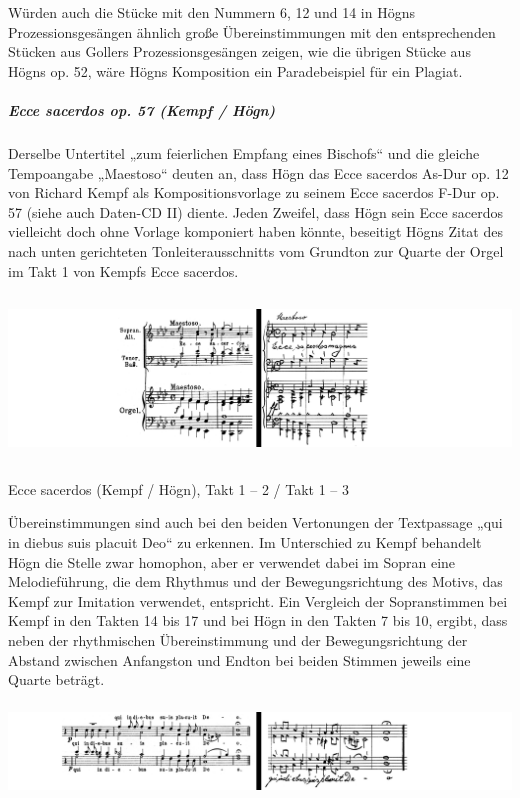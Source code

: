 Würden auch die Stücke mit den Nummern 6, 12 und 14 in Högns
Prozessionsgesängen ähnlich große Übereinstimmungen mit den
entsprechenden Stücken aus Gollers Prozessionsgesängen zeigen, wie die
übrigen Stücke aus Högns op. 52, wäre Högns Komposition ein
Paradebeispiel für ein Plagiat.

\subparagraph[Ecce sacerdos op. 57 (Kempf / Högn)]{Ecce sacerdos op. 57
(Kempf / Högn)}
Derselbe Untertitel „zum feierlichen Empfang eines Bischofs“ und die
gleiche Tempoangabe „Maestoso“ deuten an, dass Högn das Ecce sacerdos
As-Dur op. 12 von Richard Kempf als Kompositionsvorlage zu seinem Ecce
sacerdos F-Dur op. 57 (siehe auch Daten-CD II) diente. Jeden Zweifel,
dass Högn sein Ecce sacerdos vielleicht doch ohne Vorlage komponiert
haben könnte, beseitigt Högns Zitat des nach unten gerichteten
Tonleiterausschnitts vom Grundton zur Quarte der Orgel im Takt 1 von
Kempfs Ecce sacerdos.


\includegraphics[width=15.977cm,height=4.394cm]{pictures/zulassungsarbeit-img085.png}

\begin{figure}
\img{}
\caption{}
\end{figure}

Ecce sacerdos (Kempf / Högn), Takt 1 –
2  / Takt 1 – 3

Übereinstimmungen sind auch bei den beiden Vertonungen der Textpassage
„qui in diebus suis placuit Deo“ zu erkennen. Im Unterschied zu Kempf
behandelt Högn die Stelle zwar homophon, aber er verwendet dabei im
Sopran eine Melodieführung, die dem Rhythmus und der Bewegungsrichtung
des Motivs, das Kempf zur Imitation verwendet, entspricht. Ein
Vergleich der Sopranstimmen bei Kempf in den Takten 14 bis 17 und bei
Högn in den Takten 7 bis 10, ergibt, dass neben der rhythmischen
Übereinstimmung und der Bewegungsrichtung der Abstand zwischen
Anfangston und Endton bei beiden Stimmen jeweils eine Quarte beträgt.


\includegraphics[width=15.977cm,height=2.499cm]{pictures/zulassungsarbeit-img086.png}

